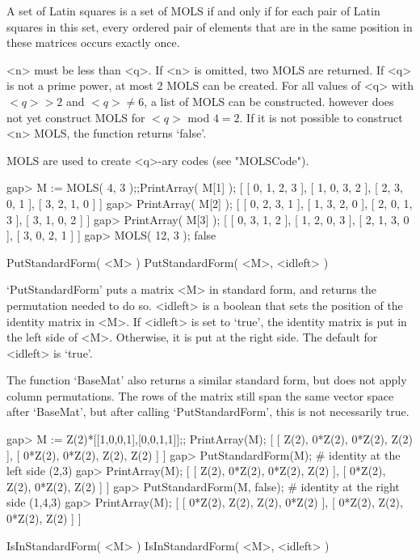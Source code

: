 A set of Latin squares is a set of MOLS  if and only  if for each pair of
Latin squares in this set, every ordered pair of elements that are in the
same position in these matrices occurs exactly once.

<n> must be less than <q>.  If <n> is omitted, two  MOLS are returned. If
<q> is not a prime power,  at most 2 MOLS  can be created. For all values
of  <q> with  $<q>   > 2$ and $<q>    \neq 6$, a   list  of  MOLS can  be
constructed. {\GUAVA} however  does not yet  construct MOLS for $<q>$ mod
$4 = 2$.  If  it  is not possible   to construct <n> MOLS,  the  function
returns `false'.

MOLS are used to create <q>-ary codes (see "MOLSCode").

\beginexample
gap> M := MOLS( 4, 3 );;PrintArray( M[1] );
[ [  0,  1,  2,  3 ],
  [  1,  0,  3,  2 ],
  [  2,  3,  0,  1 ],
  [  3,  2,  1,  0 ] ]
gap> PrintArray( M[2] );
[ [  0,  2,  3,  1 ],
  [  1,  3,  2,  0 ],
  [  2,  0,  1,  3 ],
  [  3,  1,  0,  2 ] ]
gap> PrintArray( M[3] );
[ [  0,  3,  1,  2 ],
  [  1,  2,  0,  3 ],
  [  2,  1,  3,  0 ],
  [  3,  0,  2,  1 ] ]
gap> MOLS( 12, 3 );
false 
\endexample

\>PutStandardForm( <M> )
\>PutStandardForm( <M>, <idleft> )

`PutStandardForm' puts   a matrix <M>  in standard  form, and returns the
permutation needed to do so. <idleft> is a boolean that sets the position
of the identity matrix in <M>. If <idleft> is set to `true', the identity
matrix is put in the left side of <M>. Otherwise,  it is put at the right
side. The default for <idleft> is `true'.

The function `BaseMat' also returns a similar standard form, but does not
apply column  permutations. The  rows of the  matrix  still span the same
vector space after `BaseMat',  but after calling `PutStandardForm',  this
is not necessarily true.

\beginexample
gap> M := Z(2)*[[1,0,0,1],[0,0,1,1]];; PrintArray(M);
[ [    Z(2),  0*Z(2),  0*Z(2),    Z(2) ],
  [  0*Z(2),  0*Z(2),    Z(2),    Z(2) ] ]
gap> PutStandardForm(M);                   # identity at the left side
(2,3)
gap> PrintArray(M);
[ [    Z(2),  0*Z(2),  0*Z(2),    Z(2) ],
  [  0*Z(2),    Z(2),  0*Z(2),    Z(2) ] ]
gap> PutStandardForm(M, false);            # identity at the right side
(1,4,3)
gap> PrintArray(M);
[ [  0*Z(2),    Z(2),    Z(2),  0*Z(2) ],
  [  0*Z(2),    Z(2),  0*Z(2),    Z(2) ] ]
\endexample

\>IsInStandardForm( <M> )
\>IsInStandardForm( <M>, <idleft> )

